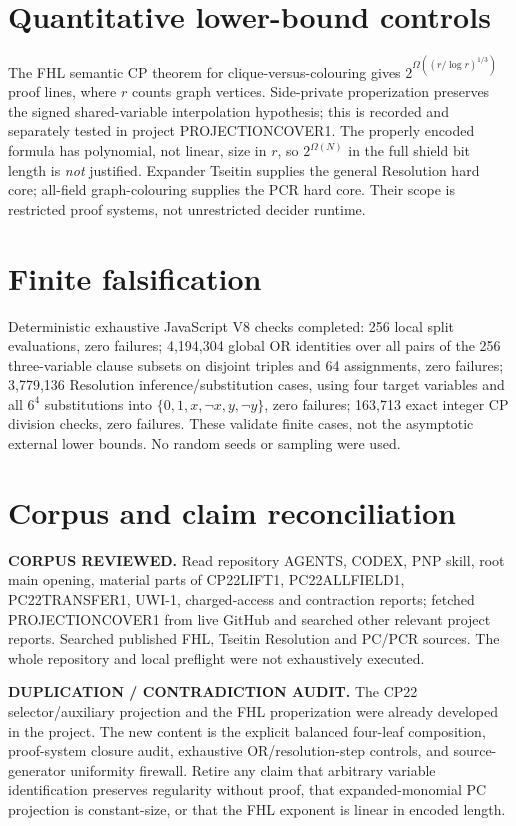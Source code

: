 \documentclass[11pt]{article}
\begin{document}
\section{Quantitative lower-bound controls}
The FHL semantic CP theorem for clique-versus-colouring gives
$2^{\Omega((r/\log r)^{1/3})}$ proof lines, where $r$ counts
graph vertices. Side-private properization preserves the
signed shared-variable interpolation hypothesis; this is
recorded and separately tested in project PROJECTIONCOVER1.
The properly encoded formula has polynomial, not linear,
size in $r$, so $2^{\Omega(N)}$ in the full shield bit length
is \emph{not} justified. Expander Tseitin supplies the
general Resolution hard core; all-field graph-colouring
supplies the PCR hard core. Their scope is restricted
proof systems, not unrestricted decider runtime.

\section{Finite falsification}
Deterministic exhaustive JavaScript V8 checks completed:
256 local split evaluations, zero failures;
4,194,304 global OR identities over all pairs of the
256 three-variable clause subsets on disjoint triples and
64 assignments, zero failures;
3,779,136 Resolution inference/substitution cases,
using four target variables and all $6^4$ substitutions
into $\{0,1,x,\neg x,y,\neg y\}$, zero failures;
163,713 exact integer CP division checks, zero failures.
These validate finite cases, not the asymptotic external
lower bounds. No random seeds or sampling were used.

\section{Corpus and claim reconciliation}
\noindent\textbf{CORPUS REVIEWED.} Read repository AGENTS,
CODEX, PNP skill, root main opening, material parts of
CP22LIFT1, PC22ALLFIELD1, PC22TRANSFER1, UWI-1,
charged-access and contraction reports; fetched
PROJECTIONCOVER1 from live GitHub and searched other
relevant project reports. Searched published FHL,
Tseitin Resolution and PC/PCR sources. The whole
repository and local preflight were not exhaustively
executed.

\noindent\textbf{DUPLICATION / CONTRADICTION AUDIT.}
The CP22 selector/auxiliary projection and the FHL
properization were already developed in the project.
The new content is the explicit balanced four-leaf
composition, proof-system closure audit, exhaustive
OR/resolution-step controls, and source-generator
uniformity firewall. Retire any claim that arbitrary
variable identification preserves regularity without proof,
that expanded-monomial PC projection is constant-size,
or that the FHL exponent is linear in encoded length.
\end{document}
